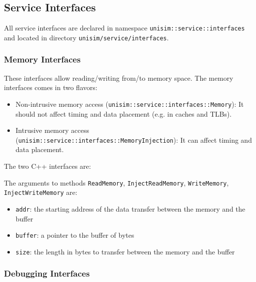 \newpage
\subsection{Service Interfaces}
\label{tms320c3x_interfaces}

All service interfaces are declared in namespace \texttt{unisim::service::interfaces} and located in directory \texttt{unisim/service/interfaces}.

\subsubsection{Memory Interfaces}

These interfaces allow reading/writing from/to memory space. The memory interfaces comes in two flavors:
\begin{itemize}
\item Non-intrusive memory access (\texttt{unisim::service::interfaces::Memory}): It should not affect timing and data placement (e.g. in caches and TLBs).
\item Intrusive memory access (\texttt{unisim::service::interfaces::MemoryInjection}): It can affect timing and data placement.
\end{itemize}

\noindent The two C++ interfaces are:

\begin{center}
	
\end{center}

\begin{center}
	
\end{center}

\noindent The arguments to methods \texttt{ReadMemory}, \texttt{InjectReadMemory}, \texttt{WriteMemory}, \texttt{InjectWriteMemory} are:
\begin{itemize}
\item \texttt{addr}: the starting address of the data transfer between the memory and the buffer
\item \texttt{buffer}: a pointer to the buffer of bytes
\item \texttt{size}: the length in bytes to transfer between the memory and the buffer
\end{itemize}

\subsubsection{Debugging Interfaces}

